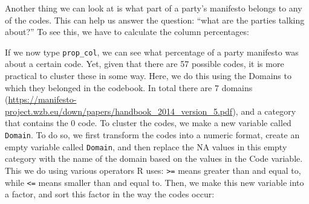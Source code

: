 \documentclass[
]{article}
\newenvironment{Shaded}{\begin{snugshade}}{\end{snugshade}}
\newcommand{\DecValTok}[1]{\textcolor[rgb]{0.00,0.00,0.81}{#1}}
\newcommand{\FunctionTok}[1]{\textcolor[rgb]{0.00,0.00,0.00}{#1}}
\newcommand{\NormalTok}[1]{#1}
\newcommand{\OtherTok}[1]{\textcolor[rgb]{0.56,0.35,0.01}{#1}}
\newcommand{\SpecialCharTok}[1]{\textcolor[rgb]{0.00,0.00,0.00}{#1}}
\newcommand{\StringTok}[1]{\textcolor[rgb]{0.31,0.60,0.02}{#1}}
\begin{document}
Another thing we can look at is what part of a party's manifesto belongs to any of the codes. This can help us answer the question: ``what are the parties talking about?'' To see this, we have to calculate the column percentages:

\begin{Shaded}
\end{Shaded}

If we now type \texttt{prop\_col}, we can see what percentage of a party manifesto was about a certain code. Yet, given that there are 57 possible codes, it is more practical to cluster these in some way. Here, we do this using the Domains to which they belonged in the codebook. In total there are 7 domains (\url{https://manifesto-project.wzb.eu/down/papers/handbook_2014_version_5.pdf}), and a category that contains the 0 code. To cluster the codes, we make a new variable called \texttt{Domain}. To do so, we first transform the codes into a numeric format, create an empty variable called \texttt{Domain}, and then replace the NA values in this empty category with the name of the domain based on the values in the Code variable. This we do using various operators R uses: \texttt{\textgreater{}=} means greater than and equal to, while \texttt{\textless{}=} means smaller than and equal to. Then, we make this new variable into a factor, and sort this factor in the way the codes occur:
\end{document}
